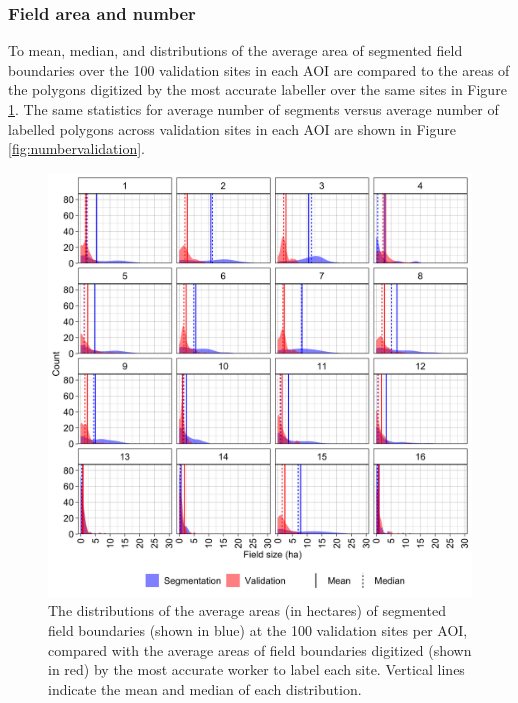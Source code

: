 \documentclass[
  11pt,
  a4paper]{article}
\begin{document}
\hypertarget{field-area-and-number}{%
\subsubsection{Field area and number}\label{field-area-and-number}}

To mean, median, and distributions of the average area of segmented
field boundaries over the 100 validation sites in each AOI are compared
to the areas of the polygons digitized by the most accurate labeller
over the same sites in Figure \ref{fig:areavalidation}. The same
statistics for average number of segments versus average number of
labelled polygons across validation sites in each AOI are shown in
Figure \ref{fig:numbervalidation}.\\

\begin{figure}[!ht]

{\centering \includegraphics[width=0.9\linewidth,]{figures/si_validation_stats_fha2} 

}

\caption{The distributions of the average areas (in hectares) of segmented field boundaries (shown in blue) at the 100 validation sites per AOI, compared with the average areas of field boundaries digitized (shown in red) by the most accurate worker to label each site. Vertical lines indicate the mean and median of each distribution.}\label{fig:areavalidation}
\end{figure}
\end{document}
